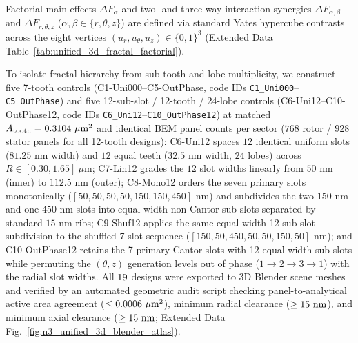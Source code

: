 \documentclass[pdflatex,sn-nature]{sn-jnl}
\DeclareRobustCommand{\roundfour}[1]{\fpeval{round(#1,4)}}
\begin{document}
Factorial main effects $\Delta F_\alpha$ and two- and three-way interaction synergies $\Delta F_{\alpha,\beta}$ and $\Delta F_{r,\theta,z}$ ($\alpha,\beta \in \{r,\theta,z\}$) are defined via standard Yates hypercube contrasts across the eight vertices $(u_r, u_\theta, u_z) \in \{0,1\}^3$ (Extended Data Table~\ref{tab:unified_3d_fractal_factorial}).

To isolate fractal hierarchy from sub-tooth and lobe multiplicity, we construct five 7-tooth controls (C1-Uni000--C5-OutPhase, code IDs \texttt{C1\_Uni000}--\texttt{C5\_OutPhase}) and five 12-sub-slot / 12-tooth / 24-lobe controls (C6-Uni12--C10-OutPhase12, code IDs \texttt{C6\_Uni12}--\texttt{C10\_OutPhase12}) at matched $A_{\rm tooth} = 0.3104\ \mu\text{m}^2$ and identical BEM panel counts per sector ($768$ rotor / $928$ stator panels for all 12-tooth designs): C6-Uni12 spaces $12$ identical uniform slots ($81.25\text{ nm}$ width) and $12$ equal teeth ($32.5\text{ nm}$ width, $24$ lobes) across $R \in [0.30, 1.65]\ \mu\text{m}$; C7-Lin12 grades the $12$ slot widths linearly from $50\text{ nm}$ (inner) to $112.5\text{ nm}$ (outer); C8-Mono12 orders the seven primary slots monotonically ($[50, 50, 50, 50, 150, 150, 450]\text{ nm}$) and subdivides the two $150\text{ nm}$ and one $450\text{ nm}$ slots into equal-width non-Cantor sub-slots separated by standard $15\text{ nm}$ ribs; C9-Shuf12 applies the same equal-width 12-sub-slot subdivision to the shuffled 7-slot sequence ($[150, 50, 450, 50, 50, 150, 50]\text{ nm}$); and C10-OutPhase12 retains the 7 primary Cantor slots with 12 equal-width sub-slots while permuting the $(\theta, z)$ generation levels out of phase ($1 \to 2 \to 3 \to 1$) with the radial slot widths. All $19{}$ designs were exported to 3D Blender scene meshes and verified by an automated geometric audit script checking panel-to-analytical active area agreement ($\le \roundfour{\NthreeBlenderAuditMaxAreaErrUmtwo}\ \mu\text{m}^2$), minimum radial clearance ($\ge 15{}\text{ nm}$), and minimum axial clearance ($\ge 15{}\text{ nm}$; Extended Data Fig.~\ref{fig:n3_unified_3d_blender_atlas}).
\end{document}

